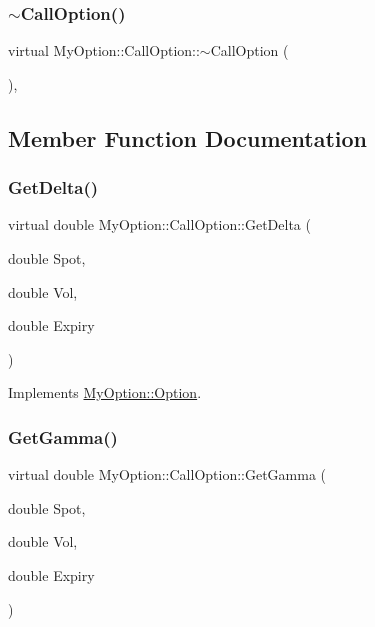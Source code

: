 \subsubsection{\texorpdfstring{$\sim$\+Call\+Option()}{~CallOption()}}
{\footnotesize\ttfamily virtual My\+Option\+::\+Call\+Option\+::$\sim$\+Call\+Option (\begin{DoxyParamCaption}{ }\end{DoxyParamCaption})\hspace{0.3cm}{\ttfamily [inline]}, {\ttfamily [virtual]}}



\subsection{Member Function Documentation}
\hypertarget{classMyOption_1_1CallOption_a46b6e6aa7b12967b825f50ec66911e51}{}\label{classMyOption_1_1CallOption_a46b6e6aa7b12967b825f50ec66911e51} 
\subsubsection{\texorpdfstring{Get\+Delta()}{GetDelta()}}
{\footnotesize\ttfamily virtual double My\+Option\+::\+Call\+Option\+::\+Get\+Delta (\begin{DoxyParamCaption}\item[{double}]{Spot,  }\item[{double}]{Vol,  }\item[{double}]{Expiry }\end{DoxyParamCaption})\hspace{0.3cm}{\ttfamily [virtual]}}



Implements \hyperlink{classMyOption_1_1Option_a4947bde99bb5e46b79aa0f36fd353d9b}{My\+Option\+::\+Option}.

\hypertarget{classMyOption_1_1CallOption_a135259127b922e4ce4db8243c3c52a54}{}\label{classMyOption_1_1CallOption_a135259127b922e4ce4db8243c3c52a54} 
\subsubsection{\texorpdfstring{Get\+Gamma()}{GetGamma()}}
{\footnotesize\ttfamily virtual double My\+Option\+::\+Call\+Option\+::\+Get\+Gamma (\begin{DoxyParamCaption}\item[{double}]{Spot,  }\item[{double}]{Vol,  }\item[{double}]{Expiry }\end{DoxyParamCaption})\hspace{0.3cm}{\ttfamily [virtual]}}



